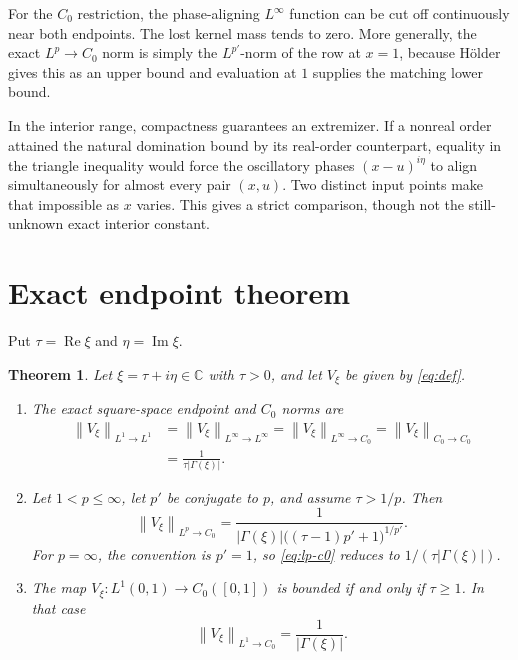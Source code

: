 \documentclass[11pt]{article}
\newcommand{\C}{\mathbb C}
\newcommand{\1}{\mathbf 1}
\newcommand{\norm}[1]{\left\lVert #1\right\rVert}
\newtheorem{theorem}{Theorem}
\begin{document}
For the \(C_0\) restriction, the phase-aligning \(L^\infty\) function can be
cut off continuously near both endpoints.  The lost kernel mass tends to
zero.  More generally, the exact \(L^p\to C_0\) norm is simply the
\(L^{p'}\)-norm of the row at \(x=1\), because H\"older gives this as an upper
bound and evaluation at \(1\) supplies the matching lower bound.

In the interior range, compactness guarantees an extremizer.  If a nonreal
order attained the natural domination bound by its real-order counterpart,
equality in the triangle inequality would force the oscillatory phases
\((x-u)^{i\eta}\) to align simultaneously for almost every pair \((x,u)\).
Two distinct input points make that impossible as \(x\) varies.  This gives a
strict comparison, though not the still-unknown exact interior constant.

\section{Exact endpoint theorem}

Put \(\tau=\operatorname{Re}\xi\) and \(\eta=\operatorname{Im}\xi\).

\begin{theorem}\label{thm:main}
Let \(\xi=\tau+i\eta\in\C\) with \(\tau>0\), and let \(V_\xi\) be given by
\eqref{eq:def}.

\begin{enumerate}[label=\textup{(\roman*)}]
\item The exact square-space endpoint and \(C_0\) norms are
\begin{align*}
 \norm{V_\xi}_{L^1\to L^1}
 &=\norm{V_\xi}_{L^\infty\to L^\infty}
 =\norm{V_\xi}_{L^\infty\to C_0}
 =\norm{V_\xi}_{C_0\to C_0}\\
 &=\frac{1}{\tau|\Gamma(\xi)|}.
\end{align*}

\item Let \(1<p\le\infty\), let \(p'\) be conjugate to \(p\), and assume
\(\tau>1/p\).  Then
\begin{equation}\label{eq:lp-c0}
 \norm{V_\xi}_{L^p\to C_0}
 =\frac{1}{|\Gamma(\xi)|
 \bigl((\tau-1)p'+1\bigr)^{1/p'}}.
\end{equation}
For \(p=\infty\), the convention is \(p'=1\), so \eqref{eq:lp-c0}
reduces to \(1/(\tau|\Gamma(\xi)|)\).

\item The map \(V_\xi:L^1(0,1)\to C_0([0,1])\) is bounded if and only if
\(\tau\ge1\).  In that case
\begin{equation}\label{eq:l1-c0}
 \norm{V_\xi}_{L^1\to C_0}=\frac{1}{|\Gamma(\xi)|}.
\end{equation}
\end{enumerate}
\end{theorem}
\end{document}
